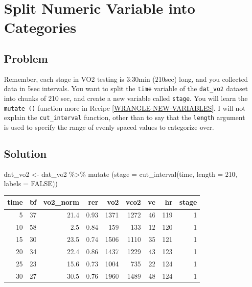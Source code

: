 \documentclass[
]{book}
\newenvironment{Shaded}{\begin{snugshade}}{\end{snugshade}}
\newcommand{\AttributeTok}[1]{\textcolor[rgb]{0.77,0.63,0.00}{#1}}
\newcommand{\ConstantTok}[1]{\textcolor[rgb]{0.00,0.00,0.00}{#1}}
\newcommand{\DecValTok}[1]{\textcolor[rgb]{0.00,0.00,0.81}{#1}}
\newcommand{\FunctionTok}[1]{\textcolor[rgb]{0.00,0.00,0.00}{#1}}
\newcommand{\NormalTok}[1]{#1}
\newcommand{\OtherTok}[1]{\textcolor[rgb]{0.56,0.35,0.01}{#1}}
\newcommand{\SpecialCharTok}[1]{\textcolor[rgb]{0.00,0.00,0.00}{#1}}
\begin{document}
\hypertarget{WRANGLE-NUMERIC-CATEGORY}{%
\section{Split Numeric Variable into Categories}\label{WRANGLE-NUMERIC-CATEGORY}}

\hypertarget{problem-4}{%
\subsection{Problem}\label{problem-4}}

Remember, each stage in VO2 testing is 3:30min (210sec) long, and you collected data in 5sec intervals. You want to split the \texttt{time} variable of the \texttt{dat\_vo2} dataset into chunks of 210 sec, and create a new variable called \texttt{stage}. You will learn the \texttt{mutate\ ()} function more in Recipe \ref{WRANGLE-NEW-VARIABLES}. I will not explain the \texttt{cut\_interval} function, other than to say that the \texttt{length} argument is used to specify the range of evenly spaced values to categorize over.

\hypertarget{solution-4}{%
\subsection{Solution}\label{solution-4}}

\begin{Shaded}
\begin{Highlighting}[]
\NormalTok{dat\_vo2 }\OtherTok{\textless{}{-}}\NormalTok{ dat\_vo2 }\SpecialCharTok{\%\textgreater{}\%}
  \FunctionTok{mutate}\NormalTok{ (}\AttributeTok{stage =} \FunctionTok{cut\_interval}\NormalTok{(time, }\AttributeTok{length =} \DecValTok{210}\NormalTok{, }\AttributeTok{labels =} \ConstantTok{FALSE}\NormalTok{))}
\end{Highlighting}
\end{Shaded}

\begin{tabular}{r|r|r|r|r|r|r|r|r}
\hline
time & bf & vo2\_norm & rer & vo2 & vco2 & ve & hr & stage\\
\hline
5 & 37 & 21.4 & 0.93 & 1371 & 1272 & 46 & 119 & 1\\
\hline
10 & 58 & 2.5 & 0.84 & 159 & 133 & 12 & 120 & 1\\
\hline
15 & 30 & 23.5 & 0.74 & 1506 & 1110 & 35 & 121 & 1\\
\hline
20 & 34 & 22.4 & 0.86 & 1437 & 1229 & 43 & 123 & 1\\
\hline
25 & 23 & 15.6 & 0.73 & 1004 & 735 & 22 & 124 & 1\\
\hline
30 & 27 & 30.5 & 0.76 & 1960 & 1489 & 48 & 124 & 1\\
\hline
\end{tabular}
\end{document}
